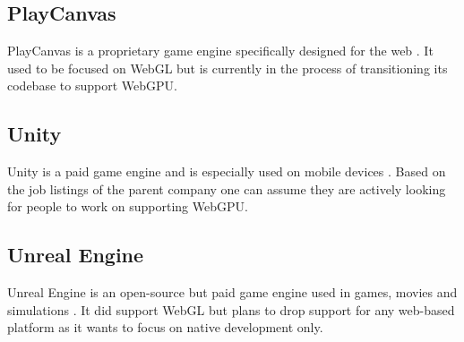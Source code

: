 \subsection{PlayCanvas}
PlayCanvas is a proprietary game engine specifically designed for the web \parencite{playcanvas}. It used to be focused on WebGL but is currently in the process of transitioning its codebase to support WebGPU.

\subsection{Unity}
Unity is a paid game engine and is especially used on mobile devices \parencite{unity}. Based on the job listings of the parent company one can assume they are actively looking for people to work on supporting WebGPU. 

\subsection{Unreal Engine}

Unreal Engine is an open-source but paid game engine used in games, movies and simulations \parencite{unreal}. It did support WebGL but plans to drop support for any web-based platform as it wants to focus on native development only. 